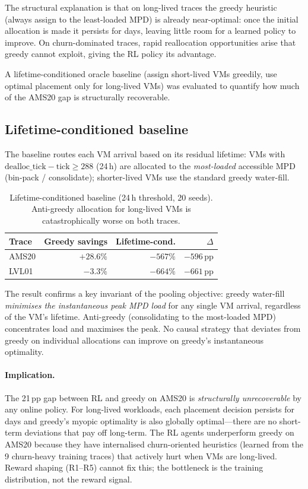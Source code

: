 \documentclass[11pt]{article}
\begin{document}
The structural explanation is that on long-lived traces the greedy
heuristic (always assign to the least-loaded MPD) is already near-optimal:
once the initial allocation is made it persists for days, leaving little
room for a learned policy to improve.  On churn-dominated traces, rapid
reallocation opportunities arise that greedy cannot exploit, giving the RL
policy its advantage.

A lifetime-conditioned oracle baseline (assign short-lived VMs greedily,
use optimal placement only for long-lived VMs) was evaluated to quantify
how much of the AMS20 gap is structurally recoverable.

\subsection{Lifetime-conditioned baseline}

The baseline routes each VM arrival based on its residual lifetime:
VMs with $\text{dealloc\_tick} - \text{tick} \geq 288$ (24\,h) are
allocated to the \emph{most-loaded} accessible MPD (bin-pack / consolidate);
shorter-lived VMs use the standard greedy water-fill.

\begin{table}[H]
\centering
\begin{tabular}{lrrr}
\toprule
\textbf{Trace} & \textbf{Greedy savings} & \textbf{Lifetime-cond.} & \textbf{$\Delta$} \\
\midrule
AMS20 & $+28.6\%$ & $-567\%$ & $-596\,\text{pp}$ \\
LVL01 & $-3.3\%$  & $-664\%$ & $-661\,\text{pp}$ \\
\bottomrule
\end{tabular}
\caption{Lifetime-conditioned baseline (24\,h threshold, 20 seeds).
  Anti-greedy allocation for long-lived VMs is catastrophically worse on both traces.}
\label{tab:lifetime}
\end{table}

The result confirms a key invariant of the pooling objective: greedy
water-fill \emph{minimises the instantaneous peak MPD load} for any single
VM arrival, regardless of the VM's lifetime.  Anti-greedy (consolidating
to the most-loaded MPD) concentrates load and maximises the peak.
No causal strategy that deviates from greedy on individual allocations
can improve on greedy's instantaneous optimality.

\paragraph{Implication.}
The 21\,pp gap between RL and greedy on AMS20 is \emph{structurally
unrecoverable} by any online policy.  For long-lived workloads, each
placement decision persists for days and greedy's myopic optimality is
also globally optimal---there are no short-term deviations that pay off
long-term.  The RL agents underperform greedy on AMS20 because they
have internalised churn-oriented heuristics (learned from the 9 churn-heavy
training traces) that actively hurt when VMs are long-lived.
Reward shaping (R1--R5) cannot fix this; the bottleneck is the
training distribution, not the reward signal.
\end{document}
